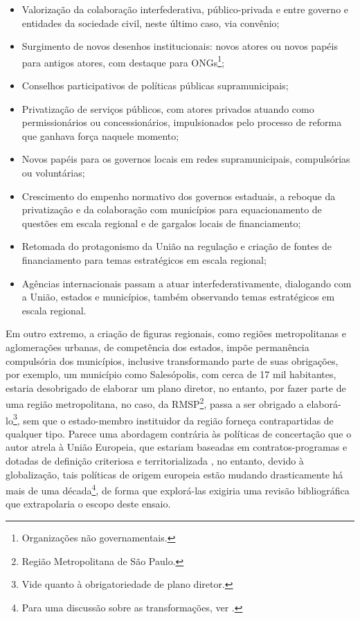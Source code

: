 \documentclass[
article,			%
11pt,				%
oneside,			%
a4paper,			%
english,			%
brazil,				%
sumario=tradicional
]{abntex2}
\begin{document}
	\begin{itemize}
		\item Valorização da colaboração interfederativa, público-privada e entre governo e entidades da sociedade civil, neste último caso, via convênio;
		\item Surgimento de novos desenhos institucionais: novos atores ou novos papéis para antigos atores, com destaque para ONGs\footnote{Organizações não governamentais.};
		\item Conselhos participativos de políticas públicas supramunicipais;
		\item Privatização de serviços públicos, com atores privados atuando como permissionários ou concessionários, impulsionados pelo processo de reforma que ganhava força naquele momento;
		\item Novos papéis para os governos locais em redes supramunicipais, compulsórias ou voluntárias;
		\item Crescimento do empenho normativo dos governos estaduais, a reboque da privatização e da colaboração com municípios para equacionamento de questões em escala regional e de gargalos locais de financiamento;
		\item Retomada do protagonismo da União na regulação e criação de fontes de financiamento para temas estratégicos em escala regional;
		\item Agências internacionais passam a atuar interfederativamente, dialogando com a União, estados e municípios, também observando temas estratégicos em escala regional.
	\end{itemize}

	Em outro extremo, a criação de figuras regionais, como regiões metropolitanas e aglomerações urbanas, de competência dos estados, impõe permanência compulsória dos municípios, inclusive transformando parte de suas obrigações, por exemplo, um município como Salesópolis, com cerca de 17 mil habitantes, estaria desobrigado de elaborar um plano diretor, no entanto, por fazer parte de uma região metropolitana, no caso, da RMSP\footnote{Região Metropolitana de São Paulo.}, passa a ser obrigado a elaborá-lo\footnote{Vide  quanto à obrigatoriedade de plano diretor.}, sem que o estado-membro instituidor da região forneça contrapartidas de qualquer tipo. Parece uma abordagem contrária às políticas de concertação que o autor atrela à União Europeia, que estariam baseadas em contratos-programas e dotadas de definição criteriosa e territorializada \cite[p. 128]{brandao2011a}, no entanto, devido à globalização, tais políticas de origem europeia estão mudando drasticamente há mais de uma década\footnote{Para uma discussão sobre as transformações, ver .}, de forma que explorá-las exigiria uma revisão bibliográfica que extrapolaria o escopo deste ensaio.
\end{document}
